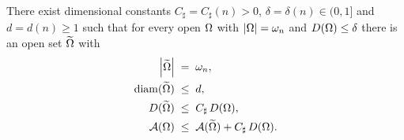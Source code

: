 \begin{lemma}\label{lem:truncation}
There exist dimensional constants $C_\sharp=C_\sharp(n)>0$,
$\delta=\delta(n)\in(0,1]$ and $d=d(n)\ge1$ such that for every open
$\Omega$ with $\left|\Omega\right|=\omega_n$ and $D(\Omega)\le\delta$ there is an open set
$\widetilde{\Omega}$ with
\begin{align}
   \left|\widetilde{\Omega}\right|\;&=\;\omega_n,\label{eq:trunc-vol}\\
   \operatorname{diam}(\widetilde{\Omega})\;&\le\;d,\label{eq:trunc-diam}\\
   D(\widetilde{\Omega})\;&\le\;C_\sharp\,D(\Omega),\label{eq:trunc-D}\\
   \mathcal{A}(\Omega)\;&\le\;\mathcal{A}(\widetilde{\Omega})+C_\sharp\,D(\Omega).\label{eq:trunc-A}
\end{align}
\end{lemma}

